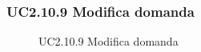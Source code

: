 \subsubsection{UC2.10.9 Modifica domanda}
\begin{figure}[H]
\centering
\noindent{}
\caption{UC2.10.9 Modifica domanda}
\end{figure}
